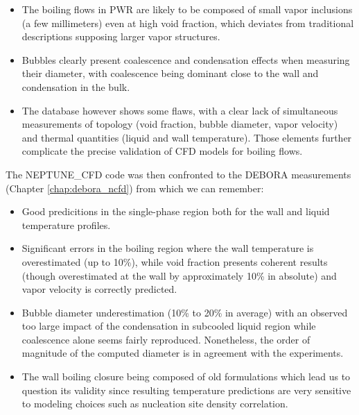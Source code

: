\begin{itemize}
\item The boiling flows in PWR are likely to be composed of small vapor inclusions (a few millimeters) even at high void fraction, which deviates from traditional descriptions supposing larger vapor structures.
\item Bubbles clearly present coalescence and condensation effects when measuring their diameter, with coalescence being dominant close to the wall and condensation in the bulk.
\item The database however shows some flaws, with a clear lack of simultaneous measurements of topology (void fraction, bubble diameter, vapor velocity) and thermal quantities (liquid and wall temperature). Those elements further complicate the precise validation of CFD models for boiling flows. 
\end{itemize}

The NEPTUNE\_CFD code was then confronted to the DEBORA measurements (Chapter \ref{chap:debora_ncfd}) from which we can remember:

\begin{itemize}
\item Good predicitions in the single-phase region both for the wall and liquid temperature profiles.
\item Significant errors in the boiling region where the wall temperature is overestimated (up to 10\%), while void fraction presents coherent results (though overestimated at the wall by approximately 10\% in absolute) and vapor velocity is correctly predicted.
\item Bubble diameter underestimation (10\% to 20\% in average) with an observed too large impact of the condensation in subcooled liquid region while coalescence alone seems fairly reproduced. Nonetheless, the order of magnitude of the computed diameter is in agreement with the experiments.
\item The wall boiling closure being composed of old formulations which lead us to question its validity since resulting temperature predictions are very sensitive to modeling choices such as nucleation site density correlation.
\end{itemize}

